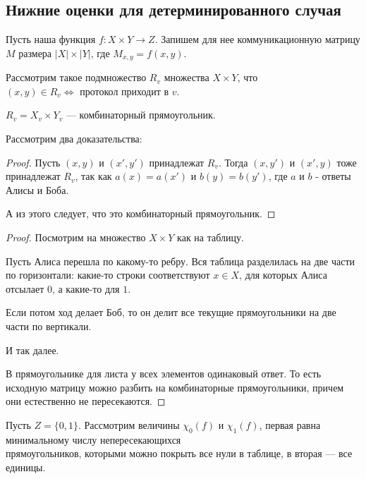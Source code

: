 \subsection{Нижние оценки для детерминированного случая}
Пусть наша функция $ f\colon X \times Y \to  Z$. 
Запишем  для нее коммуникационную матрицу $ M$ размера $ \lvert X \rvert \times \lvert Y \rvert $, где $ M_{x, y} = f(x, y)$.

Рассмотрим такое подмножество $ R_v$ множества $ X \times Y$, что $(x, y) \in R_v \Longleftrightarrow \text{ протокол приходит в }  v$.

\begin{lm}\label{lm:lm3}
	$ R_v = X_v \times Y_v$ --- комбинаторный прямоугольник.
\end{lm}
Рассмотрим два доказательства:
\begin{proof}
	Пусть $ (x, y)$ и  $ (x', y')$ принадлежат  $ R_v$. Тогда  $ (x, y')$ и  $ (x', y)$ тоже принадлежат  $ R_v$, так как $ a(x) = a(x')$ и  $ b(y) = b(y')$, где $ a$ и $ b$ - ответы Алисы и Боба.

	А из этого следует, что это комбинаторный прямоугольник.
\end{proof}
\begin{proof}
	Посмотрим на множество $ X\times Y$ как на таблицу.

    Пусть Алиса перешла по какому-то ребру. Вся таблица разделилась на две части по горизонтали: какие-то строки соответствуют $ x \in X$, для которых Алиса отсылает  $ 0$, а какие-то для $ 1$. 

	Если потом ход делает Боб, то он делит все текущие прямоугольники на две части по вертикали. 

И так далее.

В прямоугольнике для листа у всех элементов одинаковый ответ. То есть исходную матрицу можно разбить на комбинаторные прямоугольники, причем они естественно не пересекаются.
\end{proof}

\vspace{1em}
Пусть $ Z = \{0, 1\}$. Рассмотрим величины $ \chi_{0}(f)$ и $ \chi_1(f)$, первая равна минимальному числу непересекающихся \\прямоугольников, которыми можно покрыть все нули в таблице, в вторая --- все единицы.

